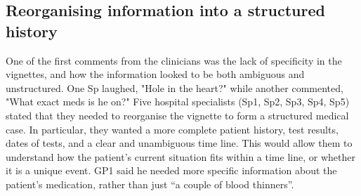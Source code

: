 \documentclass{sigchi}
\begin{document}
\subsection{Reorganising information into a structured history}
One of the first comments from the clinicians was the lack of specificity in the vignettes, and how the information looked to be both ambiguous and unstructured.  One Sp laughed, "Hole in the heart?" while another commented, "What exact meds is he on?"  Five hospital specialists (Sp1, Sp2, Sp3, Sp4, Sp5) stated that they needed to reorganise the vignette to form a structured medical case. In particular, they wanted a more complete patient history, test results, dates of tests, and a clear and unambiguous time line.  This would allow them to understand how the patient's current situation  fits within a time line, or whether it is a unique event. GP1 said he needed more specific information about the patient's medication, rather than just ``a couple of blood thinners''.







\end{document}
